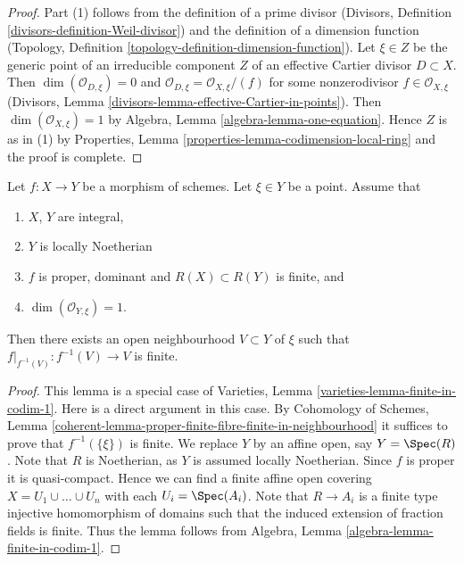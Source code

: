 \begin{proof}
Part (1) follows from the definition of a prime divisor
(Divisors, Definition \ref{divisors-definition-Weil-divisor})
and the definition of a dimension function
(Topology, Definition \ref{topology-definition-dimension-function}).
Let $\xi \in Z$ be the generic point of an irreducible component $Z$ of
an effective Cartier divisor $D \subset X$.
Then $\dim(\mathcal{O}_{D, \xi}) = 0$ and
$\mathcal{O}_{D, \xi} = \mathcal{O}_{X, \xi}/(f)$ for some
nonzerodivisor $f \in \mathcal{O}_{X, \xi}$ (Divisors,
Lemma \ref{divisors-lemma-effective-Cartier-in-points}).
Then $\dim(\mathcal{O}_{X, \xi}) = 1$ by
Algebra, Lemma \ref{algebra-lemma-one-equation}. Hence $Z$ is as in (1) by
Properties, Lemma \ref{properties-lemma-codimension-local-ring}
and the proof is complete.
\end{proof}

\begin{lemma}
\label{lemma-finite-in-codimension-one}
Let $f : X \to Y$ be a morphism of schemes.
Let $\xi \in Y$ be a point.
Assume that
\begin{enumerate}
\item $X$, $Y$ are integral,
\item $Y$ is locally Noetherian
\item $f$ is proper, dominant and $R(X) \subset R(Y)$ is finite, and
\item $\dim(\mathcal{O}_{Y, \xi}) = 1$.
\end{enumerate}
Then there exists an open neighbourhood $V \subset Y$ of $\xi$
such that $f|_{f^{-1}(V)} : f^{-1}(V) \to V$ is finite.
\end{lemma}

\begin{proof}
This lemma is a special case of
Varieties, Lemma \ref{varieties-lemma-finite-in-codim-1}.
Here is a direct argument in this case.
By Cohomology of Schemes,
Lemma \ref{coherent-lemma-proper-finite-fibre-finite-in-neighbourhood}
it suffices to prove that $f^{-1}(\{\xi\})$ is finite.
We replace $Y$ by an affine open, say $Y = \Spec(R)$.
Note that $R$ is Noetherian, as $Y$ is assumed locally Noetherian.
Since $f$ is proper it is quasi-compact. Hence we can find a finite
affine open covering $X = U_1 \cup \ldots \cup U_n$ with
each $U_i = \Spec(A_i)$. Note that $R \to A_i$ is a
finite type injective homomorphism of domains such that
the induced extension of fraction fields is finite.
Thus the lemma follows
from Algebra, Lemma \ref{algebra-lemma-finite-in-codim-1}.
\end{proof}


